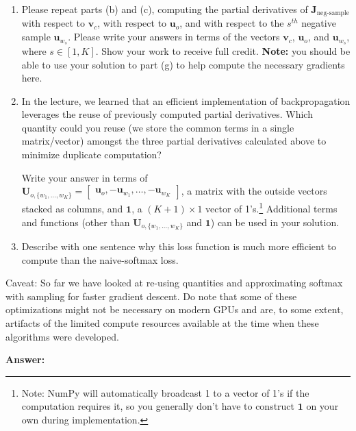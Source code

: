 \documentclass{article}
\newenvironment{answer}{
    {\bf Answer:} \sf \begingroup\color{red}
}{\endgroup}%
\begin{document}
\begin{enumerate}[label=(\alph*)]
\begin{enumerate}[label=(\roman*)]
\item Please repeat parts (b) and (c), computing the partial derivatives of $\bm J_{\text{neg-sample}}$ with respect to $\bm v_c$, with respect to $\bm u_o$, and with respect to the $s^{th}$ negative sample $\bm u_{w_s}$. Please write your answers in terms of the vectors $\bm v_c$, $\bm u_o$, and $\bm u_{w_s}$, where $s \in [1, K]$. Show your work to receive full credit. \textbf{Note:} you should be able to use your solution to part (g) to help compute the necessary gradients here.

\item In the lecture, we learned that an efficient implementation of backpropagation leverages the reuse of previously computed partial derivatives. Which quantity could you reuse (we store the common terms in a single matrix/vector) amongst the three partial derivatives calculated above to minimize duplicate computation? 

Write your answer in terms of \\ $\bm{U}_{o, \{w_1, \dots, w_K\}} = \begin{bmatrix} \bm{u}_o, -\bm{u}_{w_1}, \dots, -\bm{u}_{w_K} \end{bmatrix}$, a matrix with the outside vectors stacked as columns, and $\bm{1}$, a $(K + 1) \times 1$ vector of 1's.\footnote{Note: NumPy will automatically broadcast 1 to a vector of 1's if the computation requires it, so you generally don't have to construct $\bm{1}$ on your own during implementation.}
Additional terms and functions (other than $\bm{U}_{o, \{w_1, \dots, w_K\}}$ and $\bm{1}$) can be used in your solution.
\item Describe with one sentence why this loss function is much more efficient to compute than the naive-softmax loss.
\end{enumerate}

Caveat: So far we have looked at re-using quantities and approximating softmax with sampling for faster gradient descent. Do note that some of these optimizations might not be necessary on modern GPUs and are, to some extent, artifacts of the limited compute resources available at the time when these algorithms were developed.

\begin{shaded}
\begin{answer}

\end{answer}
\end{shaded}


\end{enumerate}
\end{document}
